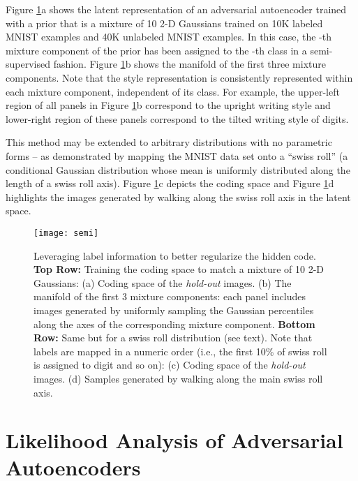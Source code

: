\documentclass{article}
\begin{document}
Figure \ref{fig_semi_regularization}a shows the latent representation of an adversarial autoencoder trained with a prior that is a mixture of 10 2-D Gaussians trained on 10K labeled MNIST examples and 40K unlabeled MNIST examples.
In this case, the -th mixture component of the prior has been assigned to the -th class in a semi-supervised fashion.
Figure \ref{fig_semi_regularization}b shows the manifold of the first three mixture components.
Note that the style representation is consistently represented within each mixture component, independent of its class.
For example, the upper-left region of all panels in Figure \ref{fig_semi_regularization}b correspond to the upright writing style and lower-right region of these panels correspond to the tilted writing style of digits.

This method may be extended to arbitrary distributions with no parametric forms -- as demonstrated by mapping the MNIST data set onto a ``swiss roll'' (a conditional Gaussian distribution whose mean is uniformly distributed along the length of a swiss roll axis).
Figure \ref{fig_semi_regularization}c depicts the coding space  and Figure \ref{fig_semi_regularization}d highlights the images generated by walking along the swiss roll axis in the latent space.


\begin{figure}[t]
\centering\texttt{[image: semi]}
\caption{\label{fig_semi_regularization}Leveraging label information to better regularize the hidden code. \textbf{Top Row:} Training the coding space to match a mixture of 10 2-D Gaussians: (a) Coding space  of the \emph{hold-out} images. (b) The manifold of the first 3 mixture components: each panel includes images generated by uniformly sampling the Gaussian percentiles along the axes of the corresponding mixture component. \textbf{Bottom Row:} Same but for a swiss roll distribution (see text). Note that labels are mapped in a numeric order (i.e., the first 10\% of swiss roll is assigned to digit  and so on): (c) Coding space  of the \emph{hold-out} images. (d) Samples generated by walking along the main swiss roll axis.}
\end{figure}


\vspace{.2cm}
\section{Likelihood Analysis of Adversarial Autoencoders}\label{experiments}
\vspace{-.3cm}
\end{document}
